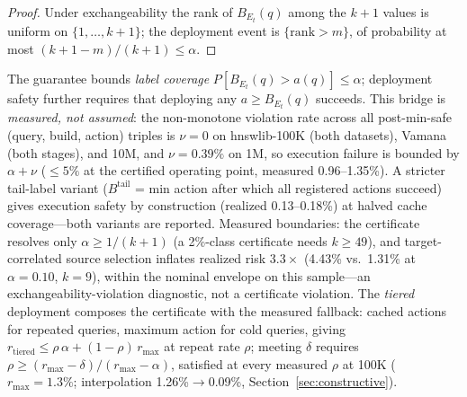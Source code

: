 \documentclass{article}
\begin{document}
\begin{proof}
Under exchangeability the rank of $B_{E_t}(q)$ among the $k{+}1$ values is uniform on
$\{1,\dots,k{+}1\}$; the deployment event is $\{\mathrm{rank}>m\}$, of probability at most
$(k{+}1-m)/(k{+}1)\le\alpha$.
\end{proof}

The guarantee bounds \emph{label coverage} $P[B_{E_t}(q)>a(q)]\le\alpha$; deployment safety further
requires that deploying any $a\ge B_{E_t}(q)$ succeeds. This bridge is \emph{measured, not assumed}: the
non-monotone violation rate across all post-min-safe (query, build, action) triples is
$\nu=0$ on hnswlib-100K (both datasets), Vamana (both stages), and 10M, and $\nu=0.39\%$ on 1M, so
execution failure is bounded by $\alpha+\nu$ ($\le5\%$ at the certified operating point, measured
0.96--1.35\%). A stricter tail-label variant ($B^{\mathrm{tail}}$ = min action after which all
registered actions succeed) gives execution safety by construction (realized 0.13--0.18\%) at halved
cache coverage---both variants are reported. Measured boundaries: the certificate resolves only
$\alpha\ge 1/(k+1)$ (a 2\%-class certificate needs $k\ge 49$), and target-correlated source selection
inflates realized risk $3.3\times$ (4.43\% vs.\ 1.31\% at $\alpha{=}0.10$, $k{=}9$), within the
nominal envelope on this sample---an exchangeability-violation diagnostic, not a certificate violation.
The \emph{tiered} deployment composes the certificate with the measured fallback: cached actions for
repeated queries, maximum action for cold queries, giving
$r_{\mathrm{tiered}}\le\rho\,\alpha+(1-\rho)\,r_{\max}$ at repeat rate $\rho$; meeting $\delta$
requires $\rho\ge(r_{\max}-\delta)/(r_{\max}-\alpha)$, satisfied at every measured $\rho$ at 100K
($r_{\max}{=}1.3\%$; interpolation 1.26\%$\to$0.09\%, Section~\ref{sec:constructive}).
\end{document}
